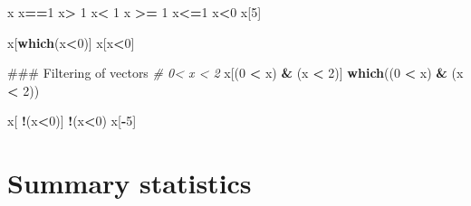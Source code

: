 \documentclass[12pt,]{book}
\newenvironment{Shaded}{\begin{snugshade}}{\end{snugshade}}
\newcommand{\KeywordTok}[1]{\textcolor[rgb]{0.13,0.29,0.53}{\textbf{#1}}}
\newcommand{\DecValTok}[1]{\textcolor[rgb]{0.00,0.00,0.81}{#1}}
\newcommand{\StringTok}[1]{\textcolor[rgb]{0.31,0.60,0.02}{#1}}
\newcommand{\CommentTok}[1]{\textcolor[rgb]{0.56,0.35,0.01}{\textit{#1}}}
\newcommand{\OperatorTok}[1]{\textcolor[rgb]{0.81,0.36,0.00}{\textbf{#1}}}
\newcommand{\NormalTok}[1]{#1}
\begin{document}
\begin{Shaded}
\begin{Highlighting}[]
\NormalTok{x}
\NormalTok{x}\OperatorTok{==}\DecValTok{1}
\NormalTok{x}\OperatorTok{>}\StringTok{ }\DecValTok{1}
\NormalTok{x}\OperatorTok{<}\StringTok{ }\DecValTok{1}
\NormalTok{x }\OperatorTok{>=}\StringTok{ }\DecValTok{1}
\NormalTok{x}\OperatorTok{<=}\DecValTok{1}
\NormalTok{x}\OperatorTok{<}\DecValTok{0}
\NormalTok{x[}\DecValTok{5}\NormalTok{]}

\NormalTok{x[}\KeywordTok{which}\NormalTok{(x}\OperatorTok{<}\DecValTok{0}\NormalTok{)]}
\NormalTok{x[x}\OperatorTok{<}\DecValTok{0}\NormalTok{]}


\NormalTok{### Filtering of vectors}
\CommentTok{# 0< x < 2}
\NormalTok{x[(}\DecValTok{0} \OperatorTok{<}\StringTok{ }\NormalTok{x) }\OperatorTok{&}\StringTok{ }\NormalTok{(x }\OperatorTok{<}\StringTok{ }\DecValTok{2}\NormalTok{)]}
\KeywordTok{which}\NormalTok{((}\DecValTok{0} \OperatorTok{<}\StringTok{ }\NormalTok{x) }\OperatorTok{&}\StringTok{ }\NormalTok{(x }\OperatorTok{<}\StringTok{ }\DecValTok{2}\NormalTok{))}

\NormalTok{x[ }\OperatorTok{!}\NormalTok{(x}\OperatorTok{<}\DecValTok{0}\NormalTok{)]}
\OperatorTok{!}\NormalTok{(x}\OperatorTok{<}\DecValTok{0}\NormalTok{)}
\NormalTok{x[}\OperatorTok{-}\DecValTok{5}\NormalTok{]}
\end{Highlighting}
\end{Shaded}

\section{Summary statistics}\label{summary-statistics}
\end{document}
